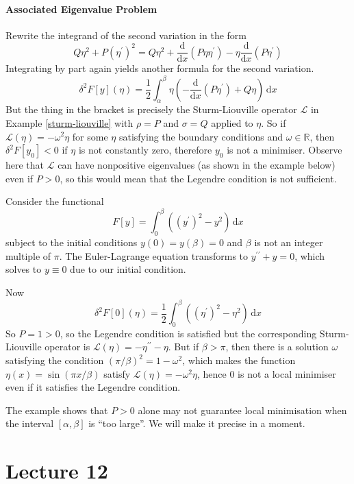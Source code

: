 \documentclass{article}
\begin{document}
\subsection{Associated Eigenvalue Problem}
Rewrite the integrand of the second variation in the form
$$Q\eta^2+P(\eta^\prime)^2=Q\eta^2+\frac{\mathrm d}{\mathrm dx}(P\eta\eta^\prime)-\eta\frac{\mathrm d}{\mathrm dx}(P\eta^\prime)$$
Integrating by part again yields another formula for the second variation.
$$\delta^2F[y](\eta)=\frac{1}{2}\int_\alpha^\beta\eta\left( -\frac{\mathrm d}{\mathrm dx}(P\eta^\prime)+ Q\eta\right)\,\mathrm dx$$
But the thing in the bracket is precisely the Sturm-Liouville operator $\mathcal L$ in Example \ref{sturm-liouville} with $\rho=P$ and $\sigma=Q$ applied to $\eta$.
So if $\mathcal L(\eta)=-\omega^2\eta$ for some $\eta$ satisfying the boundary conditions and $\omega\in\mathbb R$, then $\delta^2F[y_0]<0$ if $\eta$ is not constantly zero, therefore $y_0$ is not a minimiser.
Observe here that $\mathcal L$ can have nonpositive eigenvalues (as shown in the example below) even if $P>0$, so this would mean that the Legendre condition is not sufficient.
\begin{example}
    Consider the functional
    $$F[y]=\int_0^\beta((y^\prime)^2-y^2)\,\mathrm dx$$
    subject to the initial conditions $y(0)=y(\beta)=0$ and $\beta$ is not an integer multiple of $\pi$.
    The Euler-Lagrange equation transforms to $y^{\prime\prime}+y=0$, which solves to $y\equiv 0$ due to our initial condition.

    Now
    $$\delta^2F[0](\eta)=\frac{1}{2}\int_0^\beta((\eta^\prime)^2-\eta^2)\,\mathrm dx$$
    So $P=1>0$, so the Legendre condition is satisfied but the corresponding Sturm-Liouville operator is $\mathcal L(\eta)=-\eta^{\prime\prime}-\eta$.
    But if $\beta>\pi$, then there is a solution $\omega$ satisfying the condition $(\pi/\beta)^2=1-\omega^2$, which makes the function $\eta(x)=\sin(\pi x/\beta)$ satisfy $\mathcal L(\eta)=-\omega^2\eta$, hence $0$ is not a local minimiser even if it satisfies the Legendre condition.
\end{example}
The example shows that $P>0$ alone may not guarantee local minimisation when the interval $[\alpha,\beta]$ is ``too large''.
We will make it precise in a moment.
\newpage
\part*{Lecture 12}
\end{document}
